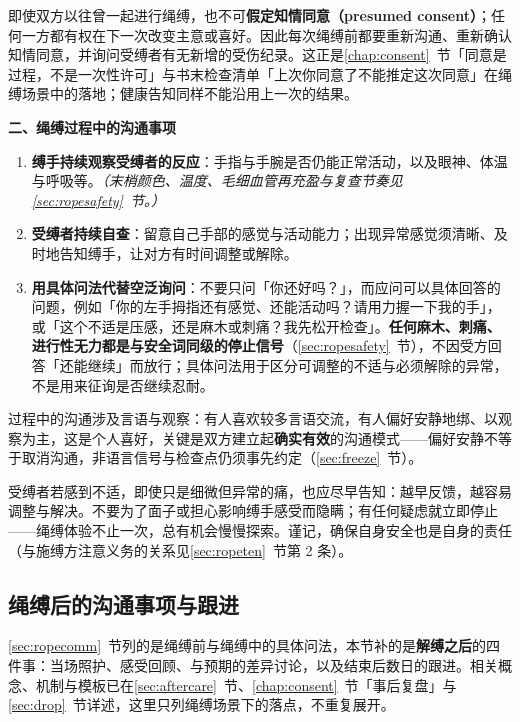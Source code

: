\documentclass[12pt,UTF8]{ctexbook}
\begin{document}
\begin{tcolorbox}[colback=pink!5!white,colframe=red!50!black,title=贴心小叮咛]
即使双方以往曾一起进行绳缚，也不可\textbf{假定知情同意（presumed consent）}；任何一方都有权在下一次改变主意或喜好。因此每次绳缚前都要重新沟通、重新确认知情同意，并询问受缚者有无新增的受伤纪录。这正是\ref{chap:consent}~节「同意是过程，不是一次性许可」与书末检查清单「上次你同意了不能推定这次同意」在绳缚场景中的落地；健康告知同样不能沿用上一次的结果。
\end{tcolorbox}

\noindent\textbf{二、绳缚过程中的沟通事项}

\begin{enumerate}
\item \textbf{缚手持续观察受缚者的反应}：手指与手腕是否仍能正常活动，以及眼神、体温与呼吸等。\textit{（末梢颜色、温度、毛细血管再充盈与复查节奏见\ref{sec:ropesafety}~节。）}
\item \textbf{受缚者持续自查}：留意自己手部的感觉与活动能力；出现异常感觉须清晰、及时地告知缚手，让对方有时间调整或解除。
\item \textbf{用具体问法代替空泛询问}：不要只问「你还好吗？」，而应问可以具体回答的问题，例如「你的左手拇指还有感觉、还能活动吗？请用力握一下我的手」，或「这个不适是压感，还是麻木或刺痛？我先松开检查」。\textbf{任何麻木、刺痛、进行性无力都是与安全词同级的停止信号}（\ref{sec:ropesafety}~节），不因受方回答「还能继续」而放行；具体问法用于区分可调整的不适与必须解除的异常，不是用来征询是否继续忍耐。
\end{enumerate}

过程中的沟通涉及言语与观察：有人喜欢较多言语交流，有人偏好安静地绑、以观察为主，这是个人喜好，关键是双方建立起\textbf{确实有效}的沟通模式——偏好安静不等于取消沟通，非语言信号与检查点仍须事先约定（\ref{sec:freeze}~节）。

受缚者若感到不适，即使只是细微但异常的痛，也应尽早告知：越早反馈，越容易调整与解决。不要为了面子或担心影响缚手感受而隐瞒；有任何疑虑就立即停止——绳缚体验不止一次，总有机会慢慢探索。谨记，确保自身安全也是自身的责任（与施缚方注意义务的关系见\ref{sec:ropeten}~节第 2 条）。

\subsection{绳缚后的沟通事项与跟进}\label{sec:ropeafter}

\ref{sec:ropecomm}~节列的是绳缚前与绳缚中的具体问法，本节补的是\textbf{解缚之后}的四件事：当场照护、感受回顾、与预期的差异讨论，以及结束后数日的跟进。相关概念、机制与模板已在\ref{sec:aftercare}~节、\ref{chap:consent}~节「事后复盘」与\ref{sec:drop}~节详述，这里只列绳缚场景下的落点，不重复展开。
\end{document}
